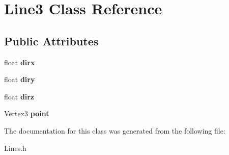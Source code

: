 \hypertarget{class_line3}{}\section{Line3 Class Reference}
\label{class_line3}
\subsection*{Public Attributes}
\begin{DoxyCompactItemize}
\item 
\mbox{\label{class_line3_a80f90b667e3f1abb1cb118e4646893e7}} 
float {\bfseries dirx}
\item 
\mbox{\label{class_line3_a768033c66821504fad97d4492cca5baa}} 
float {\bfseries diry}
\item 
\mbox{\label{class_line3_a7f2e5a8fb5e9a681b7556d8ed64dbf0b}} 
float {\bfseries dirz}
\item 
\mbox{\label{class_line3_a966b58dafbf75c08bfc7cf7a518b0434}} 
Vertex3 {\bfseries point}
\end{DoxyCompactItemize}


The documentation for this class was generated from the following file\+:\begin{DoxyCompactItemize}
\item 
Lines.\+h\end{DoxyCompactItemize}
